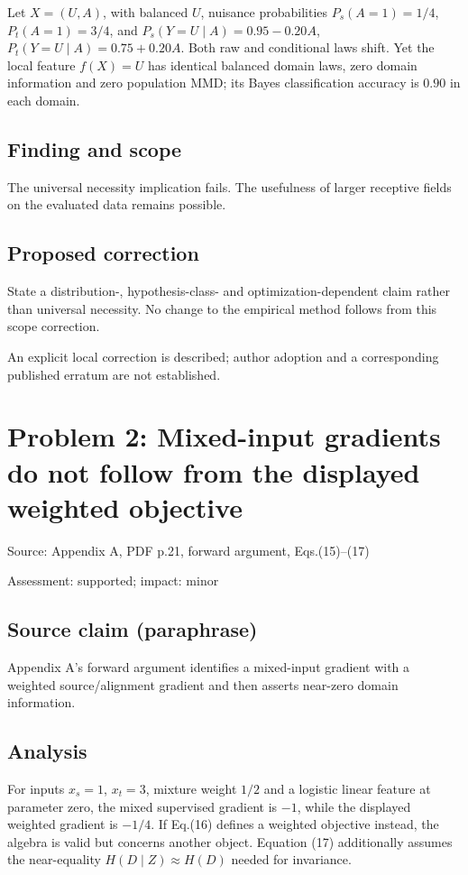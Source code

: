 \documentclass[11pt]{article}
\begin{document}
Let \(X=(U,A)\), with balanced \(U\), nuisance probabilities \(P_s(A=1)=1/4\), \(P_t(A=1)=3/4\), and \(P_s(Y=U\mid A)=0.95-0.20A\), \(P_t(Y=U\mid A)=0.75+0.20A\). Both raw and conditional laws shift. Yet the local feature \(f(X)=U\) has identical balanced domain laws, zero domain information and zero population MMD; its Bayes classification accuracy is \(0.90\) in each domain.

\subsection*{Finding and scope}

The universal necessity implication fails. The usefulness of larger receptive fields on the evaluated data remains possible.

\subsection*{Proposed correction}

State a distribution-, hypothesis-class- and optimization-dependent claim rather than universal necessity. No change to the empirical method follows from this scope correction.

An explicit local correction is described; author adoption and a corresponding published erratum are not established.

\section*{Problem 2: Mixed-input gradients do not follow from the displayed weighted objective}

Source: Appendix A, PDF p.21, forward argument, Eqs.(15)–(17)

Assessment: supported; impact: minor

\subsection*{Source claim (paraphrase)}

Appendix A’s forward argument identifies a mixed-input gradient with a weighted source/alignment gradient and then asserts near-zero domain information.

\subsection*{Analysis}

For inputs \(x_s=1\), \(x_t=3\), mixture weight \(1/2\) and a logistic linear feature at parameter zero, the mixed supervised gradient is \(-1\), while the displayed weighted gradient is \(-1/4\). If Eq.(16) defines a weighted objective instead, the algebra is valid but concerns another object. Equation (17) additionally assumes the near-equality \(H(D\mid Z)\approx H(D)\) needed for invariance.
\end{document}
